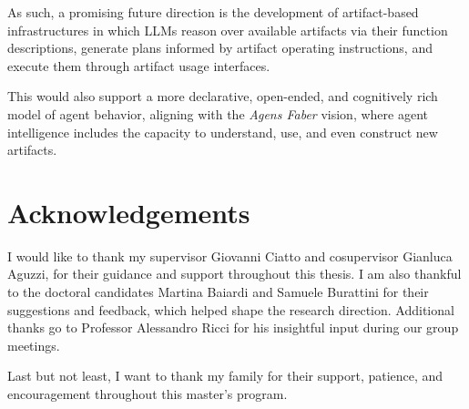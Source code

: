 \documentclass[12pt,a4paper,openright,twoside]{book}
\begin{document}
As such, a promising future direction is the development of artifact-based infrastructures in which \acp{LLM} reason over available artifacts via their function descriptions, generate plans informed by artifact operating instructions, and execute them through artifact usage interfaces.

This would also support a more declarative, open-ended, and cognitively rich model of agent behavior, aligning with the \textit{Agens Faber} vision, where agent intelligence includes the capacity to understand, use, and even construct new artifacts.

\chapter*{Acknowledgements}

I would like to thank my supervisor Giovanni Ciatto and cosupervisor Gianluca Aguzzi, for their guidance and support throughout this thesis.
%
I am also thankful to the doctoral candidates Martina Baiardi and Samuele Burattini for their suggestions and feedback, which helped shape the research direction.
%
Additional thanks go to Professor Alessandro Ricci for his insightful input during our group meetings.

Last but not least, I want to thank my family for their support, patience, and encouragement throughout this master's program.


\backmatter%
\printbibliography[heading=bibintoc]%
\end{document}
